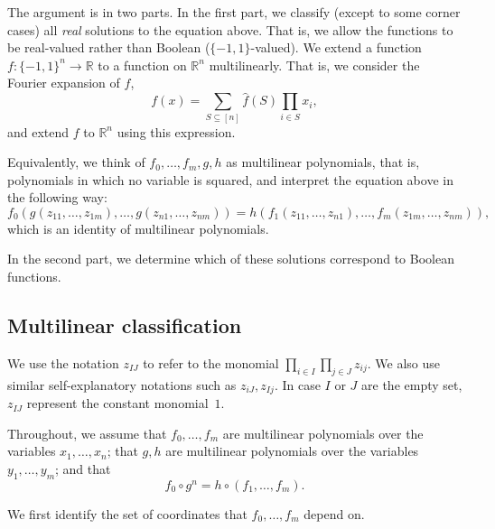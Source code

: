 \documentclass{article}
\theoremstyle{definition}
\theoremstyle{remark}
\begin{document}
The argument is in two parts. In the first part, we classify (except to some corner cases) all \emph{real} solutions to the equation above. That is, we allow the functions to be real-valued rather than Boolean ($\{-1,1\}$-valued). We extend a function $f\colon \{-1,1\}^n \to \mathbb{R}$ to a function on $\mathbb{R}^n$ multilinearly. That is, we consider the Fourier expansion of $f$,
\[
 f(x) = \sum_{S \subseteq [n]} \hat{f}(S) \prod_{i \in S} x_i,
\]
and extend $f$ to $\mathbb{R}^n$ using this expression.

Equivalently, we think of $f_0,\ldots,f_m,g,h$ as multilinear polynomials, that is, polynomials in which no variable is squared, and interpret the equation above in the following way:
\[
 f_0(g(z_{11},\ldots,z_{1m}), \ldots, g(z_{n1},\ldots,z_{nm})) =
 h(f_1(z_{11},\ldots,z_{n1}), \ldots, f_m(z_{1m},\ldots,z_{nm})),
\]
which is an identity of multilinear polynomials.

In the second part, we determine which of these solutions correspond to Boolean functions.

\subsection{Multilinear classification}
\label{sec:exact-multilinear}

We use the notation $z_{IJ}$ to refer to the monomial $\prod_{i \in I} \prod_{j \in J} z_{ij}$. We also use similar self-explanatory notations such as $z_{iJ},z_{Ij}$. In case $I$ or $J$ are the empty set, $z_{IJ}$ represent the constant monomial~$1$.

Throughout, we assume that $f_0,\ldots,f_m$ are multilinear polynomials over the variables $x_1,\ldots,x_n$; that $g,h$ are multilinear polynomials over the variables $y_1,\ldots,y_m$; and that
\[
 f_0 \circ g^n = h \circ (f_1,\ldots,f_m).
\]

We first identify the set of coordinates that $f_0,\ldots,f_m$ depend on.
\end{document}
